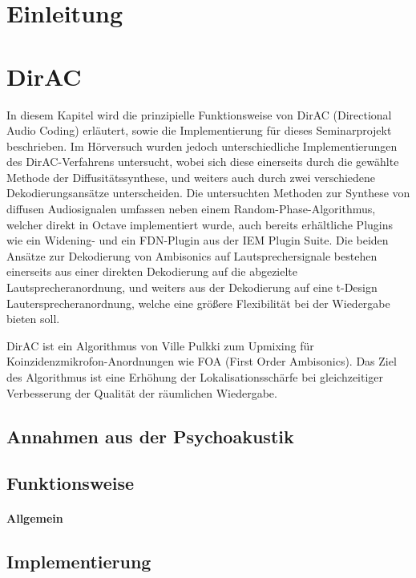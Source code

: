 \documentclass[12pt, a4paper]{article}
\begin{document}
\tableofcontents
\newpage

\section{Einleitung}

\section{DirAC}
In diesem Kapitel wird die prinzipielle Funktionsweise von DirAC (Directional Audio Coding) erläutert, sowie die Implementierung für dieses Seminarprojekt beschrieben. Im Hörversuch wurden jedoch unterschiedliche Implementierungen des DirAC-Verfahrens untersucht, wobei sich diese einerseits durch die gewählte Methode der Diffusitätssynthese, und weiters auch durch zwei verschiedene Dekodierungsansätze unterscheiden. Die untersuchten Methoden zur Synthese von diffusen Audiosignalen umfassen neben einem Random-Phase-Algorithmus, welcher direkt in Octave implementiert wurde, auch bereits erhältliche Plugins wie ein Widening- und ein FDN-Plugin aus der IEM Plugin Suite. Die beiden Ansätze zur Dekodierung von Ambisonics auf Lautsprechersignale bestehen einerseits aus einer direkten Dekodierung auf die abgezielte Lautsprecheranordnung, und weiters aus der Dekodierung auf eine t-Design Lautersprecheranordnung, welche eine größere Flexibilität bei der Wiedergabe bieten soll.

DirAC ist ein Algorithmus von Ville Pulkki \cite{pulkki} zum Upmixing für Koinzidenzmikrofon-Anordnungen wie FOA (First Order Ambisonics). Das Ziel des Algorithmus ist eine Erhöhung der Lokalisationsschärfe bei gleichzeitiger Verbesserung der Qualität der räumlichen Wiedergabe.

    \subsection{Annahmen aus der Psychoakustik} \label{annahmen}
    
    \subsection{Funktionsweise}
    
        \paragraph{Allgemein}
        
    \subsection{Implementierung}
    
\end{document}
